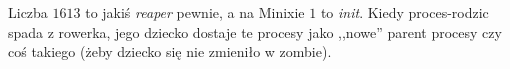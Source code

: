 Liczba \(1613\) to jakiś \textit{reaper} pewnie, a na Minixie \(1\) to \textit{init}. Kiedy proces-rodzic spada z rowerka, jego dziecko dostaje te procesy jako ,,nowe'' parent procesy czy coś takiego (żeby dziecko się nie zmieniło w zombie).